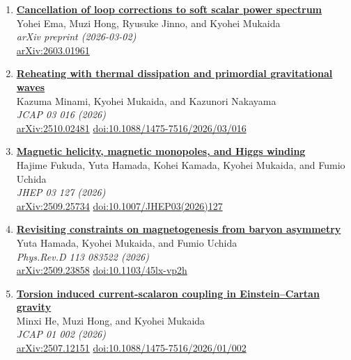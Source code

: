 \begin{enumerate}
\item \textbf{\href{https://arxiv.org/abs/2603.01961}{Cancellation of loop corrections to soft scalar power spectrum}}\\
Yohei Ema, Muzi Hong, Ryusuke Jinno, and Kyohei Mukaida\\
\emph{arXiv preprint (2026-03-02)}
\\ \href{https://arxiv.org/abs/2603.01961}{arXiv:2603.01961}

\item \textbf{\href{https://arxiv.org/abs/2510.02481}{Reheating with thermal dissipation and primordial gravitational waves}}\\
Kazuma Minami, Kyohei Mukaida, and Kazunori Nakayama\\
\emph{JCAP 03 016 (2026)}
\\ \href{https://arxiv.org/abs/2510.02481}{arXiv:2510.02481} \href{https://doi.org/10.1088/1475-7516/2026/03/016}{doi:10.1088/1475-7516/2026/03/016}

\item \textbf{\href{https://arxiv.org/abs/2509.25734}{Magnetic helicity, magnetic monopoles, and Higgs winding}}\\
Hajime Fukuda, Yuta Hamada, Kohei Kamada, Kyohei Mukaida, and Fumio Uchida\\
\emph{JHEP 03 127 (2026)}
\\ \href{https://arxiv.org/abs/2509.25734}{arXiv:2509.25734} \href{https://doi.org/10.1007/JHEP03(2026)127}{doi:10.1007/JHEP03(2026)127}

\item \textbf{\href{https://arxiv.org/abs/2509.23858}{Revisiting constraints on magnetogenesis from baryon asymmetry}}\\
Yuta Hamada, Kyohei Mukaida, and Fumio Uchida\\
\emph{Phys.Rev.D 113 083522 (2026)}
\\ \href{https://arxiv.org/abs/2509.23858}{arXiv:2509.23858} \href{https://doi.org/10.1103/45lx-vp2h}{doi:10.1103/45lx-vp2h}

\item \textbf{\href{https://arxiv.org/abs/2507.12151}{Torsion induced current-scalaron coupling in Einstein–Cartan gravity}}\\
Minxi He, Muzi Hong, and Kyohei Mukaida\\
\emph{JCAP 01 002 (2026)}
\\ \href{https://arxiv.org/abs/2507.12151}{arXiv:2507.12151} \href{https://doi.org/10.1088/1475-7516/2026/01/002}{doi:10.1088/1475-7516/2026/01/002}


\end{enumerate}
